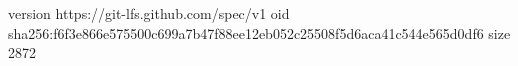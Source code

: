 version https://git-lfs.github.com/spec/v1
oid sha256:f6f3e866e575500c699a7b47f88ee12eb052c25508f5d6aca41c544e565d0df6
size 2872
